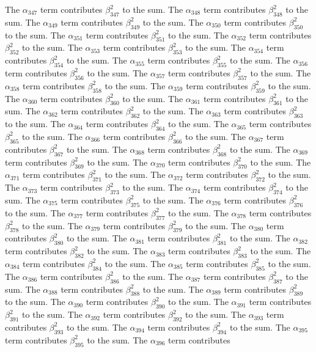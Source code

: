\begin{lemma}
The $\alpha_{347}$ term contributes $\beta_{347}^{2}$ to the sum. The $\alpha_{348}$ term contributes $\beta_{348}^{2}$ to the sum. The $\alpha_{349}$ term contributes $\beta_{349}^{2}$ to the sum. The $\alpha_{350}$ term contributes $\beta_{350}^{2}$ to the sum. The $\alpha_{351}$ term contributes $\beta_{351}^{2}$ to the sum. The $\alpha_{352}$ term contributes $\beta_{352}^{2}$ to the sum. The $\alpha_{353}$ term contributes $\beta_{353}^{2}$ to the sum. The $\alpha_{354}$ term contributes $\beta_{354}^{2}$ to the sum. The $\alpha_{355}$ term contributes $\beta_{355}^{2}$ to the sum. The $\alpha_{356}$ term contributes $\beta_{356}^{2}$ to the sum. The $\alpha_{357}$ term contributes $\beta_{357}^{2}$ to the sum. The $\alpha_{358}$ term contributes $\beta_{358}^{2}$ to the sum. The $\alpha_{359}$ term contributes $\beta_{359}^{2}$ to the sum. The $\alpha_{360}$ term contributes $\beta_{360}^{2}$ to the sum. The $\alpha_{361}$ term contributes $\beta_{361}^{2}$ to the sum. The $\alpha_{362}$ term contributes $\beta_{362}^{2}$ to the sum. The $\alpha_{363}$ term contributes $\beta_{363}^{2}$ to the sum. The $\alpha_{364}$ term contributes $\beta_{364}^{2}$ to the sum. The $\alpha_{365}$ term contributes $\beta_{365}^{2}$ to the sum. The $\alpha_{366}$ term contributes $\beta_{366}^{2}$ to the sum. The $\alpha_{367}$ term contributes $\beta_{367}^{2}$ to the sum. The $\alpha_{368}$ term contributes $\beta_{368}^{2}$ to the sum. The $\alpha_{369}$ term contributes $\beta_{369}^{2}$ to the sum. The $\alpha_{370}$ term contributes $\beta_{370}^{2}$ to the sum. The $\alpha_{371}$ term contributes $\beta_{371}^{2}$ to the sum. The $\alpha_{372}$ term contributes $\beta_{372}^{2}$ to the sum. The $\alpha_{373}$ term contributes $\beta_{373}^{2}$ to the sum. The $\alpha_{374}$ term contributes $\beta_{374}^{2}$ to the sum. The $\alpha_{375}$ term contributes $\beta_{375}^{2}$ to the sum. The $\alpha_{376}$ term contributes $\beta_{376}^{2}$ to the sum. The $\alpha_{377}$ term contributes $\beta_{377}^{2}$ to the sum. The $\alpha_{378}$ term contributes $\beta_{378}^{2}$ to the sum. The $\alpha_{379}$ term contributes $\beta_{379}^{2}$ to the sum. The $\alpha_{380}$ term contributes $\beta_{380}^{2}$ to the sum. The $\alpha_{381}$ term contributes $\beta_{381}^{2}$ to the sum. The $\alpha_{382}$ term contributes $\beta_{382}^{2}$ to the sum. The $\alpha_{383}$ term contributes $\beta_{383}^{2}$ to the sum. The $\alpha_{384}$ term contributes $\beta_{384}^{2}$ to the sum. The $\alpha_{385}$ term contributes $\beta_{385}^{2}$ to the sum. The $\alpha_{386}$ term contributes $\beta_{386}^{2}$ to the sum. The $\alpha_{387}$ term contributes $\beta_{387}^{2}$ to the sum. The $\alpha_{388}$ term contributes $\beta_{388}^{2}$ to the sum. The $\alpha_{389}$ term contributes $\beta_{389}^{2}$ to the sum. The $\alpha_{390}$ term contributes $\beta_{390}^{2}$ to the sum. The $\alpha_{391}$ term contributes $\beta_{391}^{2}$ to the sum. The $\alpha_{392}$ term contributes $\beta_{392}^{2}$ to the sum. The $\alpha_{393}$ term contributes $\beta_{393}^{2}$ to the sum. The $\alpha_{394}$ term contributes $\beta_{394}^{2}$ to the sum. The $\alpha_{395}$ term contributes $\beta_{395}^{2}$ to the sum. The $\alpha_{396}$ term contributes 
\end{lemma}
